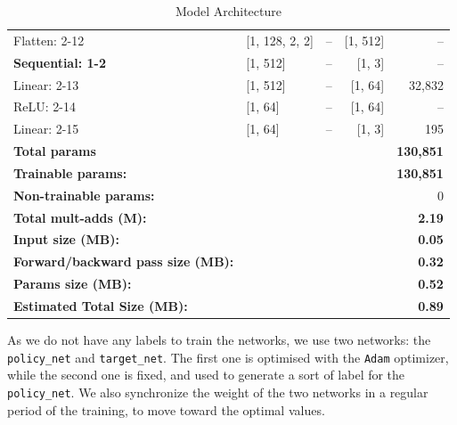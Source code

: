 \begin{table}
\begin{adjustbox}{max width=\linewidth}
\begin{tabular}{@{}llcrr@{}}
		\quad \quad Flatten: 2-12                & [1, 128, 2, 2]   & --            & [1, 512]         & --     \\
		\quad \textbf{Sequential: 1-2}                   & [1, 512]         & --            & [1, 3]           & --     \\
		\quad \quad Linear: 2-13                 & [1, 512]         & --            & [1, 64]          & 32,832 \\
		\quad \quad ReLU: 2-14                   & [1, 64]          & --            & [1, 64]          & --     \\
		\quad \quad Linear: 2-15                 & [1, 64]          & --            & [1, 3]           & 195    \\
		\midrule
		\textbf{Total params}                              &                   &              &                   & \textbf{130,851}\\
		\textbf{Trainable params:}                         &                   &              &                   & \textbf{130,851}\\
		\textbf{Non-trainable params:}                     &                   &              &                   & 0      \\
		\textbf{Total mult-adds (M):}                      &                   &              &                   & \textbf{2.19}   \\
		\midrule
		\textbf{Input size (MB):}                          &                   &              &                   & \textbf{0.05}    \\
		\textbf{Forward/backward pass size (MB):}          &                   &              &                   & \textbf{0.32}    \\
		\textbf{Params size (MB):}                         &                   &              &                   & \textbf{0.52}     \\
		\textbf{Estimated Total Size (MB):}                &                   &              &                   & \textbf{0.89}     \\
		\bottomrule
	\end{tabular}
	\end{adjustbox}
	\caption{Model Architecture}
	\label{tab:cnn-dqn}
\end{table}




As we do not have any labels to train the networks, we use two networks: the \texttt{policy\_net} and \texttt{target\_net}. The first one is optimised with the \texttt{Adam} optimizer, while the second one is fixed, and used to generate a sort of label for the \texttt{policy\_net}. We also synchronize the weight of the two networks in a regular period of the training, to move toward the optimal values.


